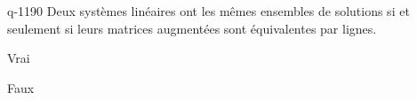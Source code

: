 \begin{truefalse}{q-1190}
Deux systèmes linéaires ont les mêmes ensembles de solutions si et seulement si leurs matrices augmentées sont équivalentes par lignes.
\item Vrai
\item* Faux
\end{truefalse}

